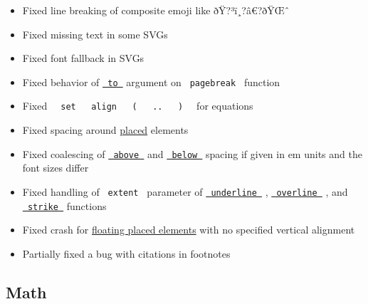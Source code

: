 \begin{itemize}
\item
  Fixed line breaking of composite emoji like ðŸ?³ï¸?â€?ðŸŒˆ
\item
  Fixed missing text in some SVGs
\item
  Fixed font fallback in SVGs
\item
  Fixed behavior of
  \href{/docs/reference/layout/pagebreak/\#parameters-to}{\texttt{\ to\ }}
  argument on \texttt{\ pagebreak\ } function
\item
  Fixed
  \texttt{\ }{\texttt{\ set\ }}\texttt{\ }{\texttt{\ align\ }}\texttt{\ }{\texttt{\ (\ }}\texttt{\ }{\texttt{\ ..\ }}\texttt{\ }{\texttt{\ )\ }}\texttt{\ }
  for equations
\item
  Fixed spacing around \href{/docs/reference/layout/place/}{placed}
  elements
\item
  Fixed coalescing of
  \href{/docs/reference/layout/block/\#parameters-above}{\texttt{\ above\ }}
  and
  \href{/docs/reference/layout/block/\#parameters-below}{\texttt{\ below\ }}
  spacing if given in em units and the font sizes differ
\item
  Fixed handling of \texttt{\ extent\ } parameter of
  \href{/docs/reference/text/underline/}{\texttt{\ underline\ }} ,
  \href{/docs/reference/text/overline/}{\texttt{\ overline\ }} , and
  \href{/docs/reference/text/strike/}{\texttt{\ strike\ }} functions
\item
  Fixed crash for
  \href{/docs/reference/layout/place/\#parameters-float}{floating placed
  elements} with no specified vertical alignment
\item
  Partially fixed a bug with citations in footnotes
\end{itemize}

\subsection{Math}\label{math}

